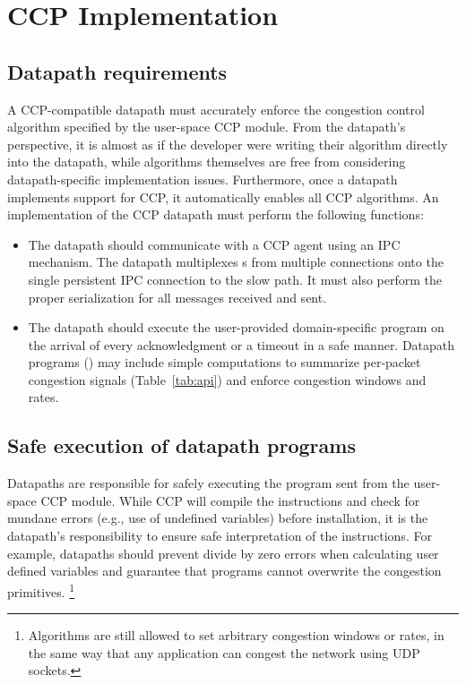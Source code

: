 \section{CCP Implementation}
\label{s:datapath}
%
\subsection{Datapath requirements}
\label{sec:implementation-basics}
A CCP-compatible datapath must accurately enforce the congestion
control algorithm specified by the user-space CCP module.
From the datapath’s perspective, it is
almost as if the developer were writing their algorithm directly
into the datapath, while algorithms themselves are free from considering datapath-specific implementation issues.
Furthermore, once a datapath implements
support for CCP, it automatically enables all CCP algorithms.
An implementation of the CCP datapath must perform the following functions:
\begin{itemize}
\item The datapath should communicate with a \userspace CCP agent using an IPC
  mechanism. The datapath multiplexes s from multiple connections
  onto the single persistent IPC connection to the slow path. It must also perform
  the proper serialization for all messages received and sent.
\item The datapath should execute the user-provided domain-specific program on
  the arrival of every acknowledgment or a timeout in a safe manner. Datapath
  programs () may include simple computations to summarize
  per-packet congestion signals (Table~\ref{tab:api}) and enforce congestion
  windows and rates.
\end{itemize}

\subsection{Safe execution of datapath programs}
\label{s:datapath:fold}
Datapaths are responsible for safely executing the program sent from the user-space CCP module. While CCP will compile the instructions and check for mundane errors (e.g., use of undefined variables) before installation, it is the datapath’s responsibility to ensure safe interpretation of the instructions. For example, datapaths should prevent divide by zero errors when calculating user defined variables and guarantee that programs cannot overwrite the congestion primitives.
\footnote{Algorithms are still allowed to set arbitrary congestion windows or rates, in the same way that any application can congest the network using UDP sockets.}

